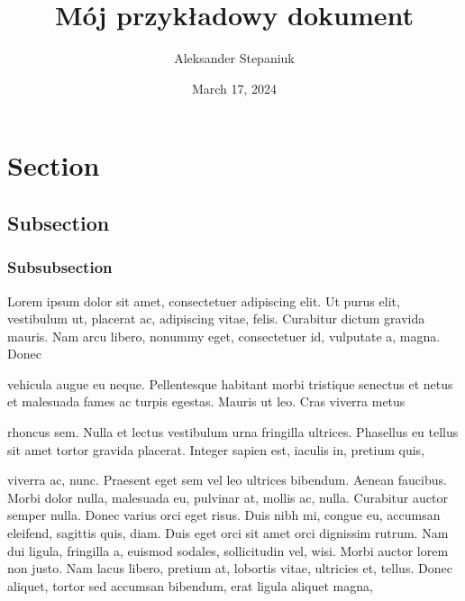 \documentclass{article}
\title{Mój przykładowy dokument}
\author{Aleksander Stepaniuk}
\date{March 17, 2024}
\begin{document}
\maketitle

\begin{figure}[b]
\tableofcontents
\end{figure}
\clearpage

\section{Section}
\subsection{Subsection}
\subsubsection{Subsubsection}
Lorem ipsum dolor sit amet, consectetuer adipiscing elit. Ut purus elit, vestibulum ut, placerat ac, adipiscing vitae, felis. Curabitur dictum gravida mauris.
Nam arcu libero, nonummy eget, consectetuer id, vulputate a, magna. Donec

vehicula augue eu neque. Pellentesque habitant morbi tristique senectus et netus et malesuada fames ac turpis egestas. Mauris ut leo. Cras viverra metus

rhoncus sem. Nulla et lectus vestibulum urna fringilla ultrices. Phasellus eu tellus sit amet tortor gravida placerat. Integer sapien est, iaculis in, pretium quis,

viverra ac, nunc. Praesent eget sem vel leo ultrices bibendum. Aenean faucibus.
Morbi dolor nulla, malesuada eu, pulvinar at, mollis ac, nulla. Curabitur auctor
semper nulla. Donec varius orci eget risus. Duis nibh mi, congue eu, accumsan
eleifend, sagittis quis, diam. Duis eget orci sit amet orci dignissim rutrum.
Nam dui ligula, fringilla a, euismod sodales, sollicitudin vel, wisi. Morbi
auctor lorem non justo. Nam lacus libero, pretium at, lobortis vitae, ultricies et,
tellus. Donec aliquet, tortor sed accumsan bibendum, erat ligula aliquet magna,
\end{document}
